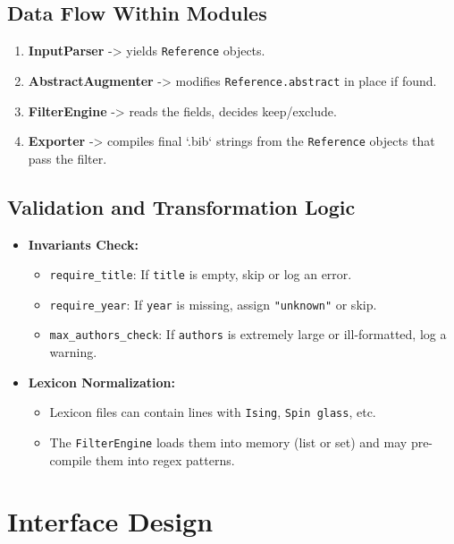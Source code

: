 \documentclass[12pt]{article}
\begin{document}
\subsection{Data Flow Within Modules}
\begin{enumerate}
  \item \textbf{InputParser} -> yields \texttt{Reference} objects.
  \item \textbf{AbstractAugmenter} -> modifies \texttt{Reference.abstract} in place if found.
  \item \textbf{FilterEngine} -> reads the fields, decides keep/exclude. 
  \item \textbf{Exporter} -> compiles final `.bib` strings from the \texttt{Reference} objects that pass the filter.
\end{enumerate}

\subsection{Validation and Transformation Logic}
\begin{itemize}
  \item \textbf{Invariants Check:} 
    \begin{itemize}
      \item \texttt{require\_title}: If \texttt{title} is empty, skip or log an error.
      \item \texttt{require\_year}: If \texttt{year} is missing, assign \texttt{"unknown"} or skip.
      \item \texttt{max\_authors\_check}: If \texttt{authors} is extremely large or ill-formatted, log a warning.
    \end{itemize}
  \item \textbf{Lexicon Normalization:} 
    \begin{itemize}
      \item Lexicon files can contain lines with \texttt{Ising}, \texttt{Spin glass}, etc.
      \item The \texttt{FilterEngine} loads them into memory (list or set) and may pre-compile them into regex patterns.
    \end{itemize}
\end{itemize}

\section{Interface Design}
\end{document}
